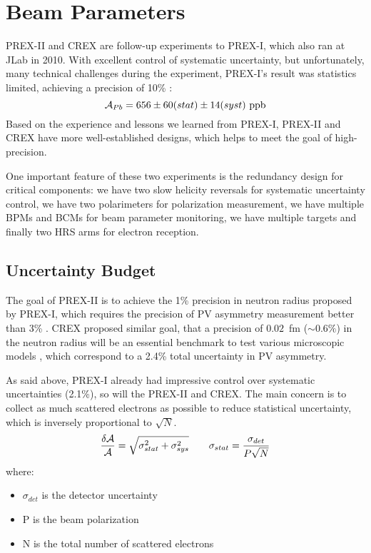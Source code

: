 \section{Beam Parameters}
PREX-II and CREX are follow-up experiments to PREX-I, which also ran at JLab in 2010. 
With excellent control of systematic uncertainty, but unfortunately, 
many technical challenges during the experiment, PREX-I's result was statistics 
limited, achieving a precision of 10\% \cite{PhysRevLett.108.112502}:
$$ \CA_{Pb} = 656 \pm 60 (stat) \pm 14 (syst) \ \mathrm{ppb} $$
Based on the experience and lessons we learned from PREX-I, 
PREX-II and CREX have more well-established designs, which helps to
meet the goal of high-precision.

One important feature of these two experiments is the redundancy design for critical
components: we have two slow helicity reversals for systematic uncertainty control,
we have two polarimeters for polarization measurement, we have multiple BPMs and
BCMs for beam parameter monitoring, we have multiple \Pb targets and finally
two HRS arms for electron reception.

\subsection{Uncertainty Budget}
The goal of PREX-II is to achieve the 1\% precision in \Pb neutron radius proposed
by PREX-I, which requires the precision of PV asymmetry measurement better than 3\% \cite{PhysRevLett.106.252501}. 
CREX proposed similar goal, that a precision of $0.02$~fm ($\sim 0.6\%$) in the
\Ca neutron radius will be an essential benchmark to test various microscopic 
models \cite{crex_proposal}, which correspond to a 2.4\% total uncertainty in PV asymmetry.

As said above, PREX-I already had impressive control over systematic uncertainties (2.1\%),
so will the PREX-II and CREX. The main concern is to collect as much scattered 
electrons as possible to reduce statistical uncertainty, which is inversely 
proportional to $\sqrt{N}$.
\begin{equation}
    \frac{\delta \mathcal{A}}{\mathcal{A}} = \sqrt{\sigma^2_{stat} + \sigma^2_{sys}}	\qquad 
    \sigma_{stat} = \frac{\sigma_{det}}{P\sqrt{N}}
\end{equation}
where:
\begin{itemize}
    \item $\sigma_{det}$ is the detector uncertainty
    \item P is the beam polarization
    \item N is the total number of scattered electrons
\end{itemize}

